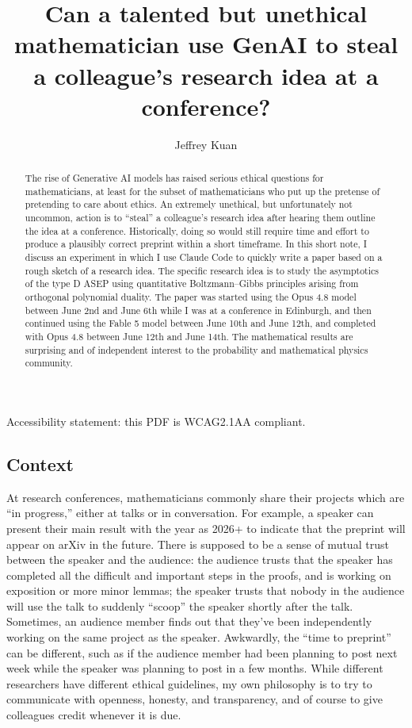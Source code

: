 \documentclass{article}
\title{Can a talented but unethical mathematician use GenAI to steal a colleague's research idea at a conference?}
\author{Jeffrey Kuan}
\begin{document}
\maketitle

\begin{abstract}
The rise of Generative AI models has raised serious ethical questions for mathematicians, at least for the subset of mathematicians who put up the pretense of pretending to care about ethics. An extremely unethical, but unfortunately not uncommon, action is to ``steal'' a colleague's research idea after hearing them outline the idea at a conference. Historically, doing so would still require time and effort to produce a plausibly correct preprint within a short timeframe. In this short note, I discuss an experiment in which I use Claude Code to quickly write a paper based on a rough sketch of a research idea. The specific research idea is to study the asymptotics of the type D ASEP using quantitative Boltzmann--Gibbs principles arising from orthogonal polynomial duality. The paper was started using the Opus 4.8 model between June 2nd and June 6th while I was at a conference in Edinburgh, and then continued using the Fable 5 model between June 10th and June 12th, and completed with Opus 4.8 between June 12th and June 14th. The mathematical results are surprising and of independent interest to the probability and mathematical physics community.     
\end{abstract}

Accessibility statement: this PDF is WCAG2.1AA compliant. 

\subsection{Context}
At research conferences, mathematicians commonly share their projects which are ``in progress,'' either at talks or in conversation. For example, a speaker can present their main result with the year as 2026+ to indicate that the preprint will appear on arXiv in the future. There is supposed to be a sense of mutual trust between the speaker and the audience: the audience trusts that the speaker has completed all the difficult and important steps in the proofs, and is working on exposition or more minor lemmas; the speaker trusts that nobody in the audience will use the talk to suddenly ``scoop'' the speaker shortly after the talk. Sometimes, an audience member finds out that they've been independently working on the same project as the speaker. Awkwardly, the ``time to preprint'' can be different, such as if the audience member had been planning to post next week while the speaker was planning to post in a few months. While different researchers have different ethical guidelines, my own philosophy is to try to communicate with openness, honesty, and transparency, and of course to give colleagues credit whenever it is due. 
\end{document}
